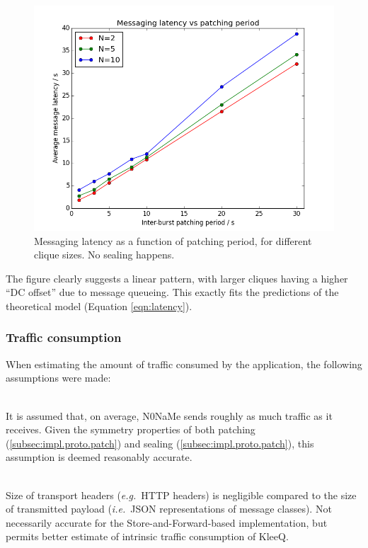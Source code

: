 \documentclass[a4paper, twoside, 12pt]{report}
\newcommand{\funkytt}{\fontfamily{AnonymousPro}\selectfont}
\begin{document}
\begin{figure}[H]
    \captionsetup{width=0.67\textwidth}
    \centering
    \includegraphics[width=0.60\linewidth]{pics/eval/latency_vs_period.png}
    \caption{\label{fig:latency_vs_period} Messaging latency as a function of patching period, for different clique sizes. No sealing happens.}
\end{figure}

The figure clearly suggests a linear pattern, with larger cliques having a higher ``DC offset'' due to message queueing. This exactly fits the predictions of the theoretical model (Equation \ref{eqn:latency}).


\subsubsection{Traffic consumption}
When estimating the amount of traffic consumed by the application, the following assumptions were made:
\begin{description}[labelindent=0.5cm, leftmargin=1.3cm, rightmargin=0.5cm]
    \item[Symmetry] \hfill \\
        It is assumed that, on average, {\funkytt N0NaMe} sends roughly as much traffic as it receives. Given the symmetry properties of both patching (\cref{subsec:impl.proto.patch}) and sealing (\cref{subsec:impl.proto.patch}), this assumption is deemed reasonably accurate.
    \item[Zero-cost transport] \hfill \\
        Size of transport headers (\textit{e.g.}~HTTP headers) is negligible compared to the size of transmitted payload (\textit{i.e.}~JSON representations of message classes). Not necessarily accurate for the Store-and-Forward-based implementation, but permits better estimate of intrinsic traffic consumption of KleeQ.
\end{description}
\end{document}
